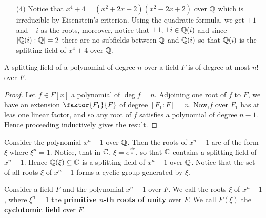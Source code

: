 \begin{example}
\begin{enumerate}
    \item[(4)] Notice that $x^4+4=(x^2+2x+2)(x^2-2x+2)$ over $\mathbb{Q}$ which is
      irreducible by Eisenstein's criterion. Using the quadratic formula,
      we get $\pm{1}$ and $\pm{i}$ as the roots, moreover, notice that
      $\pm{1},\pm{i} \in \mathbb{Q}(i)$ and since $[\mathbb{Q}(i):\mathbb{Q}]=2$ there are no
      subfields between $\mathbb{Q}$ and  $\mathbb{Q}(i)$ so that $\mathbb{Q}(i)$ is the splitting
      field of $x^4+4$ over  $\mathbb{Q}$.
  \end{enumerate}
\end{example}

\begin{lemma}\label{lemma_8.4.2}
  A splitting field of a polynomial of degree $n$ over a field  $F$ is of
  degree at most  $n!$ over  $F$.
\end{lemma}
\begin{proof}
  Let $f \in F[x]$ a polynomial of $\deg{f}=n$. Adjoining one root of $f$ to
  $F$, we have an extension $\faktor{F_1}{F}$ of degree $[F_1:F]=n$. Now,$f$
  over $F_1$ has at leas one linear factor, and so any root of $f$ satisfies a
  polynomial of degree $n-1$. Hence proceeding inductively gives the result.
\end{proof}

\begin{example}\label{example_8.12}
  Consider the polynomial $x^n-1$ over  $\mathbb{Q}$. Then the roots of  $x^n-1$ are
  of the form  $\xi$ where  $\xi^n=1$. Notice, that in  $\mathbb{C}$,
  $\xi=e^{\frac{2i\pi}{n}}$, so that $\mathbb{C}$ contains a splitting field of
  $x^n-1$. Hence  $\mathbb{Q}(\xi) \subseteq \mathbb{C}$ is a splitting field of $x^n-1$ over
  $\mathbb{Q}$. Notice that the set of all roots $\xi$ of  $x^n-1$ forms a cyclic
  group generated by $\xi$.
\end{example}

\begin{definition}
  Consider a field $F$ and the polynomial $x^n-1$ over $F$. We call the roots
  $\xi$ of  $x^n-1$, where  $\xi^n=1$ the  \textbf{primitive $n$-th roots of
  unity} over $F$. We call  $F(\xi)$ the \textbf{cyclotomic field} over $F$.
\end{definition}

